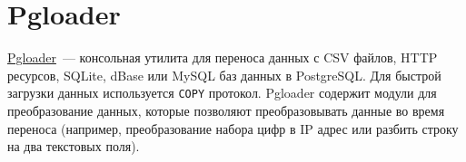 \section{Pgloader}

\href{http://pgloader.io/}{Pgloader}~--- консольная утилита для переноса данных с CSV файлов, HTTP ресурсов, SQLite, dBase или MySQL баз данных в PostgreSQL. Для быстрой загрузки данных используется \lstinline!COPY! протокол. Pgloader содержит модули для преобразование данных, которые позволяют преобразовывать данные во время переноса (например, преобразование набора цифр в IP адрес или разбить строку на два текстовых поля).
